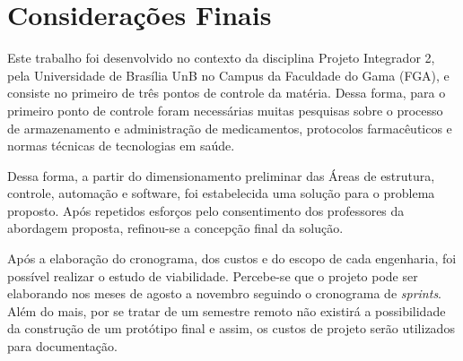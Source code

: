 \chapter[Considerações Finais]{Considerações Finais}

Este trabalho foi desenvolvido no contexto da disciplina Projeto Integrador 2,
pela Universidade de Brasília UnB no Campus da Faculdade do Gama (FGA), e consiste no
primeiro de três pontos de controle da matéria. Dessa forma, para o primeiro ponto de controle foram necessárias muitas pesquisas sobre o processo de armazenamento e administração de medicamentos, protocolos farmacêuticos e normas técnicas de tecnologias em saúde. 

Dessa forma, a partir do dimensionamento preliminar das Áreas de estrutura, controle, automação e software, foi estabelecida uma solução para o problema proposto. Após repetidos esforços pelo consentimento dos professores da abordagem proposta, refinou-se a concepção final da solução.  

Após a elaboração do cronograma, dos custos e do escopo de cada engenharia, foi possível realizar o estudo de viabilidade. Percebe-se que o projeto pode ser elaborando nos meses de agosto a novembro seguindo o cronograma de \textit{sprints}. Além do mais, por se tratar de um semestre remoto não existirá a possibilidade da construção de um protótipo final e assim, os custos de projeto serão utilizados para documentação.



